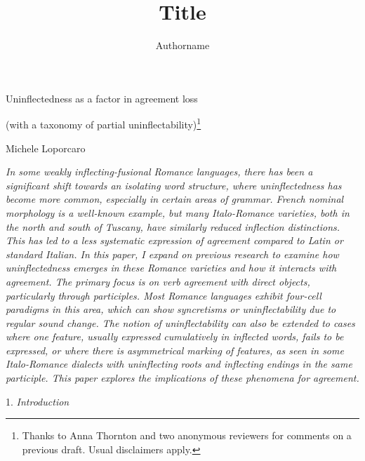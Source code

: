 \documentclass[output=paper]{langscibook}
\author{Authorname\orcid{}\affiliation{}}
\title{Title}
\begin{document}
\maketitle 

\begin{styleTit}
Uninflectedness as a factor in agreement loss 
\end{styleTit}

\begin{styleTit}
(with a taxonomy of partial uninflectability)\footnote{Thanks to Anna Thornton and two anonymous reviewers for comments on a previous draft. Usual disclaimers apply.}
\end{styleTit}

Michele Loporcaro

\begin{styleTabellaFitta}
 \textit{In some weakly inflecting-fusional Romance languages, there has been a significant shift towards an isolating word structure, where uninflectedness has become more common, especially in certain areas of grammar. French nominal morphology is a well-known example, but many Italo-Romance varieties, both in the north and south of Tuscany, have similarly reduced inflection distinctions. This has led to a less systematic expression of agreement compared to Latin or standard Italian. In this paper, I expand on previous research to examine how uninflectedness emerges in these Romance varieties and how it interacts with agreement. The primary focus is on verb agreement with direct objects, particularly through participles. Most Romance languages exhibit four-cell paradigms in this area, which can show syncretisms or uninflectability due to regular sound change. The notion of uninflectability can also be extended to cases where one feature, usually expressed cumulatively in inflected words, fails to be expressed, or where there is asymmetrical marking of features, as seen in some Italo-Romance dialects with uninflecting roots and inflecting endings in the same participle. This paper explores the implications of these phenomena for agreement.}
\end{styleTabellaFitta}

\begin{styleBiblio}
1. \textit{Introduction}
\end{styleBiblio}
\end{document}
